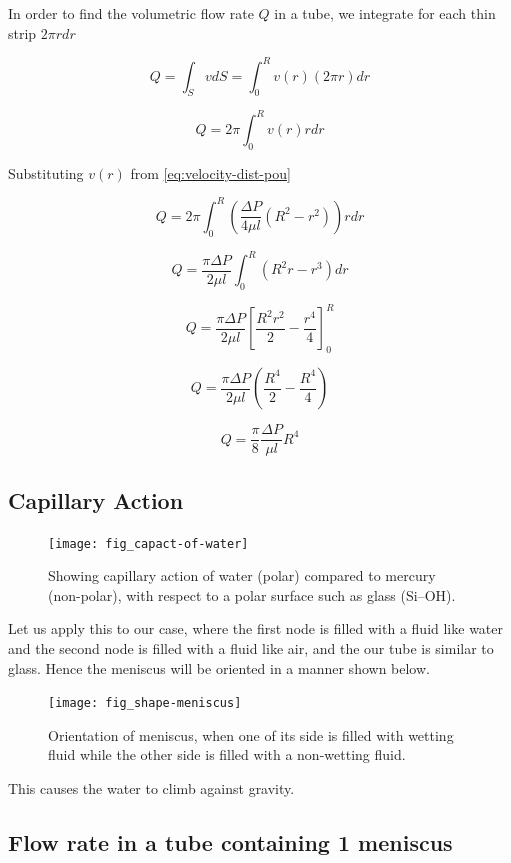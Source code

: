 	In order to find the volumetric flow rate $Q$ in a tube, we integrate for each thin strip $2 \pi r dr$
	
	\[ Q = \int_{S} vdS = \int_{0}^{R} v(r) (2 \pi r) dr \]
	
	\[ Q = 2 \pi \int_{0}^{R} v(r) r dr \]
	
	Substituting $v(r)$ from \ref{eq:velocity-dist-pou}
	
	\[ Q = 2 \pi \int_{0}^{R} \left( \frac{\Delta P}{4 \mu l} (R^2 - r^2)\right) r dr \]
	
	\[ Q =  \frac{\pi \Delta P}{2 \mu l} \int_{0}^{R} (R^2r - r^3)dr \]
	
	\[ Q =  \frac{\pi \Delta P}{2 \mu l} \left[ \frac{R^2r^2}{2} - \frac{r^4}{4} \right]_{0}^{R} \]
	
	\[ Q =  \frac{\pi \Delta P}{2 \mu l} \left( \frac{R^4}{2} - \frac{R^4}{4} \right) \]
	
	\begin{equation} \label{eq:flow-rate}
		\boxed{Q = \frac{\pi}{8} \frac{\Delta P}{\mu l} R^4}
	\end{equation}

\subsection{Capillary Action}

	\begin{figure}[H]
		\texttt{[image: fig\_capact-of-water]}
		\caption{Showing capillary action of water (polar) compared to mercury (non-polar), with respect to a polar surface such as glass (Si–OH).}
		\label{fig_capact-of-water}
	\end{figure}
	
	Let us apply this to our case, where the first node is filled with a fluid like water and the second node is filled with a fluid like air, and the our tube is similar to glass. Hence the meniscus will be oriented in a manner shown below.
	
	\begin{figure}[H]
		\texttt{[image: fig\_shape-meniscus]}
		\caption{Orientation of meniscus, when one of its side is filled with wetting fluid while the other side is filled with a non-wetting fluid.}
		\label{fig_shape-meniscus}
	\end{figure}
	
	This causes the water to climb against gravity.
	
	



\subsection{Flow rate in a tube containing 1 meniscus}

